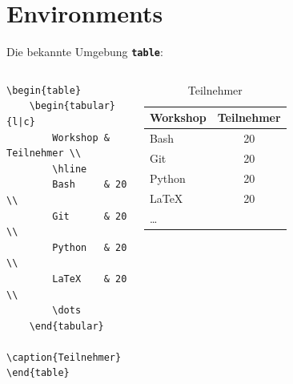 \documentclass[14pt,aspectratio=169]{beamer}
\begin{document}

\section{Environments}
\sectionframe

\begin{frame}[fragile]{\insertsection}
    
    Die bekannte Umgebung \textbf{\texttt{table}}: \vspace{1em}
    
    \begin{columns}
        
        \begin{verbatim}
\begin{table}
    \begin{tabular}{l|c}
        Workshop & Teilnehmer \\
        \hline
        Bash     & 20 \\
        Git      & 20 \\
        Python   & 20 \\
        LaTeX    & 20 \\
        \dots    
    \end{tabular}
    \caption{Teilnehmer}
\end{table}
        \end{verbatim}
        
        
        \begin{table}
            \begin{tabular}{l|c}
                Workshop & Teilnehmer \\
                \hline
                Bash     & 20 \\
                Git      & 20 \\
                Python   & 20 \\
                LaTeX    & 20 \\
                \dots    
            \end{tabular}
            \caption{Teilnehmer}
        \end{table}
    \end{columns}
    

    \note{}
\end{frame}
\end{document}
